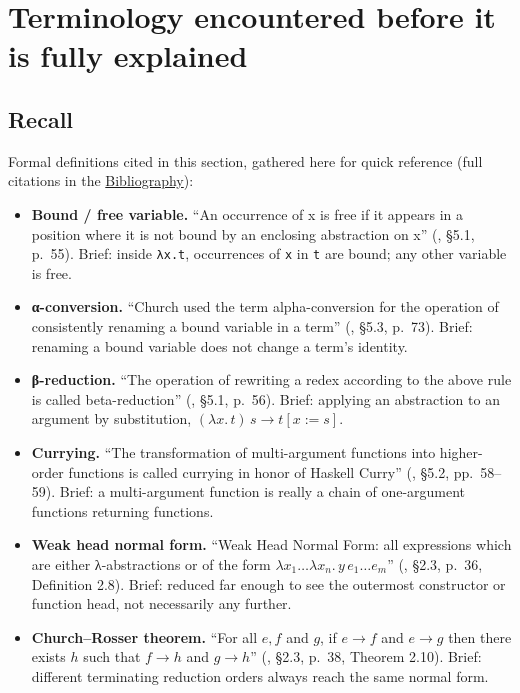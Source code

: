 \section{Terminology encountered before it is fully explained}\label{sec:01-basics:04-terminology:1}

\subsection{Recall}\label{sec:01-basics:04-terminology:2}

Formal definitions cited in this section, gathered here for quick reference (full citations in the \hyperref[sec:root:bibliography:1]{Bibliography}):

\begin{itemize}
\tightlist
\item
  \textbf{Bound / free variable.} ``An occurrence of x is free if it appears in a position where it is not bound by an enclosing abstraction on x'' (\cite{Pierce2002}, §5.1, p.~55). Brief: inside \texttt{λx.t}, occurrences of \texttt{x} in \texttt{t} are bound; any other variable is free.
\item
  \textbf{α-conversion.} ``Church used the term alpha-conversion for the operation of consistently renaming a bound variable in a term'' (\cite{Pierce2002}, §5.3, p.~73). Brief: renaming a bound variable does not change a term's identity.
\item
  \textbf{β-reduction.} ``The operation of rewriting a redex according to the above rule is called beta-reduction'' (\cite{Pierce2002}, §5.1, p.~56). Brief: applying an abstraction to an argument by substitution, \((\lambda x.\, t)\, s \to t[x := s]\).
\item
  \textbf{Currying.} ``The transformation of multi-argument functions into higher-order functions is called currying in honor of Haskell Curry'' (\cite{Pierce2002}, §5.2, pp.~58--59). Brief: a multi-argument function is really a chain of one-argument functions returning functions.
\item
  \textbf{Weak head normal form.} ``Weak Head Normal Form: all expressions which are either λ-abstractions or of the form \(\lambda x_1 \ldots \lambda x_n.\, y\, e_1 \ldots e_m\)'' (\cite{Thompson1991}, §2.3, p.~36, Definition 2.8). Brief: reduced far enough to see the outermost constructor or function head, not necessarily any further.
\item
  \textbf{Church--Rosser theorem.} ``For all \(e, f\) and \(g\), if \(e \to f\) and \(e \to g\) then there exists \(h\) such that \(f \to h\) and \(g \to h\)'' (\cite{Thompson1991}, §2.3, p.~38, Theorem 2.10). Brief: different terminating reduction orders always reach the same normal form.

\end{itemize}
